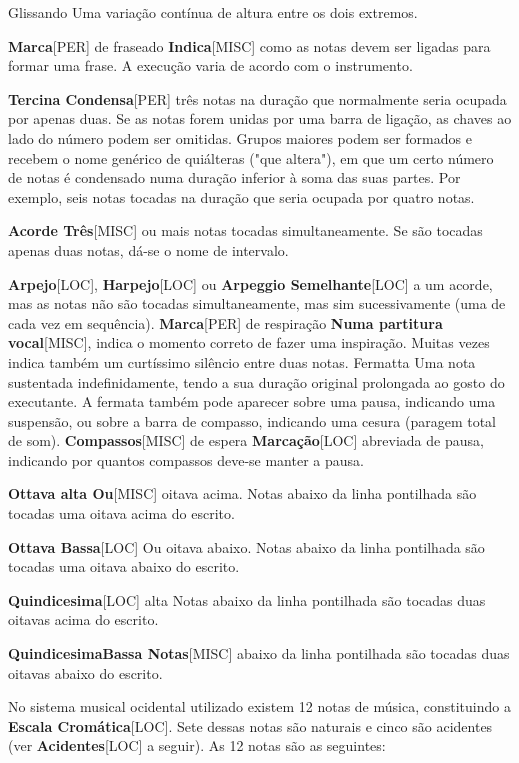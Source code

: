 \documentclass[a4paper,12pt]{article}
\begin{document}
Glissando Uma variação contínua de altura entre os dois extremos.

\textbf{Marca}\textsc{[PER]} de fraseado \textbf{Indica}\textsc{[MISC]} como as notas devem ser ligadas para formar uma frase. A execução varia de acordo com o instrumento.

\textbf{Tercina Condensa}\textsc{[PER]} três notas na duração que normalmente seria ocupada por apenas duas. Se as notas forem unidas por uma barra de ligação, as chaves ao lado do número podem ser omitidas. Grupos maiores podem ser formados e recebem o nome genérico de quiálteras ("que altera"), em que um certo número de notas é condensado numa duração inferior à soma das suas partes. Por exemplo, seis notas tocadas na duração que seria ocupada por quatro notas.

\textbf{Acorde Três}\textsc{[MISC]} ou mais notas tocadas simultaneamente. Se são tocadas apenas duas notas, dá-se o nome de intervalo.

\textbf{Arpejo}\textsc{[LOC]}, \textbf{Harpejo}\textsc{[LOC]} ou \textbf{Arpeggio Semelhante}\textsc{[LOC]} a um acorde, mas as notas não são tocadas simultaneamente, mas sim sucessivamente (uma de cada vez em sequência). \textbf{Marca}\textsc{[PER]} de respiração \textbf{Numa partitura vocal}\textsc{[MISC]}, indica o momento correto de fazer uma inspiração. Muitas vezes indica também um curtíssimo silêncio entre duas notas. Fermatta Uma nota sustentada indefinidamente, tendo a sua duração original prolongada ao gosto do executante. A fermata também pode aparecer sobre uma pausa, indicando uma suspensão, ou sobre a barra de compasso, indicando uma cesura (paragem total de som). \textbf{Compassos}\textsc{[MISC]} de espera \textbf{Marcação}\textsc{[LOC]} abreviada de pausa, indicando por quantos compassos deve-se manter a pausa.

\textbf{Ottava alta Ou}\textsc{[MISC]} oitava acima. Notas abaixo da linha pontilhada são tocadas uma oitava acima do escrito.

\textbf{Ottava Bassa}\textsc{[LOC]} Ou oitava abaixo. Notas abaixo da linha pontilhada são tocadas uma oitava abaixo do escrito.

\textbf{Quindicesima}\textsc{[LOC]} alta Notas abaixo da linha pontilhada são tocadas duas oitavas acima do escrito.

\textbf{QuindicesimaBassa Notas}\textsc{[MISC]} abaixo da linha pontilhada são tocadas duas oitavas abaixo do escrito.

No sistema musical ocidental utilizado existem 12 notas de música, constituindo a \textbf{Escala Cromática}\textsc{[LOC]}. Sete dessas notas são naturais e cinco são acidentes (ver \textbf{Acidentes}\textsc{[LOC]} a seguir). As 12 notas são as seguintes:
\end{document}
